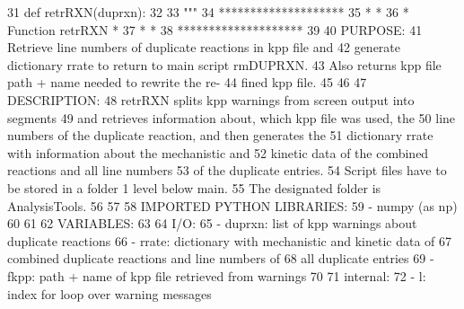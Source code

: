 \begin{DoxyCode}
31 \textcolor{keyword}{def }retrRXN(duprxn):
32 
33     \textcolor{stringliteral}{"""}
34 \textcolor{stringliteral}{    ********************}
35 \textcolor{stringliteral}{    *                  *}
36 \textcolor{stringliteral}{    * Function retrRXN *}
37 \textcolor{stringliteral}{    *                  *}
38 \textcolor{stringliteral}{    ********************}
39 \textcolor{stringliteral}{}
40 \textcolor{stringliteral}{    PURPOSE:}
41 \textcolor{stringliteral}{        Retrieve line numbers of duplicate reactions in kpp file and}
42 \textcolor{stringliteral}{        generate dictionary rrate to return to main script rmDUPRXN.}
43 \textcolor{stringliteral}{        Also returns kpp file path + name needed to rewrite the re-}
44 \textcolor{stringliteral}{        fined kpp file.}
45 \textcolor{stringliteral}{}
46 \textcolor{stringliteral}{}
47 \textcolor{stringliteral}{    DESCRIPTION:}
48 \textcolor{stringliteral}{        retrRXN splits kpp warnings from screen output into segments}
49 \textcolor{stringliteral}{        and retrieves information about, which kpp file was used, the}
50 \textcolor{stringliteral}{        line numbers of the duplicate reaction, and then generates the}
51 \textcolor{stringliteral}{        dictionary rrate with information about the mechanistic and}
52 \textcolor{stringliteral}{        kinetic data of the combined reactions and all line numbers}
53 \textcolor{stringliteral}{        of the duplicate entries.}
54 \textcolor{stringliteral}{        Script files have to be stored in a folder 1 level below main.}
55 \textcolor{stringliteral}{        The designated folder is AnalysisTools.}
56 \textcolor{stringliteral}{}
57 \textcolor{stringliteral}{}
58 \textcolor{stringliteral}{    IMPORTED PYTHON LIBRARIES:}
59 \textcolor{stringliteral}{        - numpy (as np)}
60 \textcolor{stringliteral}{}
61 \textcolor{stringliteral}{}
62 \textcolor{stringliteral}{    VARIABLES:}
63 \textcolor{stringliteral}{}
64 \textcolor{stringliteral}{    I/O:}
65 \textcolor{stringliteral}{        - duprxn:   list of kpp warnings about duplicate reactions}
66 \textcolor{stringliteral}{        - rrate:    dictionary with mechanistic and kinetic data of}
67 \textcolor{stringliteral}{                    combined duplicate reactions and line numbers of}
68 \textcolor{stringliteral}{                    all duplicate entries}
69 \textcolor{stringliteral}{        - fkpp:     path + name of kpp file retrieved from warnings}
70 \textcolor{stringliteral}{}
71 \textcolor{stringliteral}{    internal:}
72 \textcolor{stringliteral}{        - l:        index for loop over warning messages}

\end{DoxyCode}
